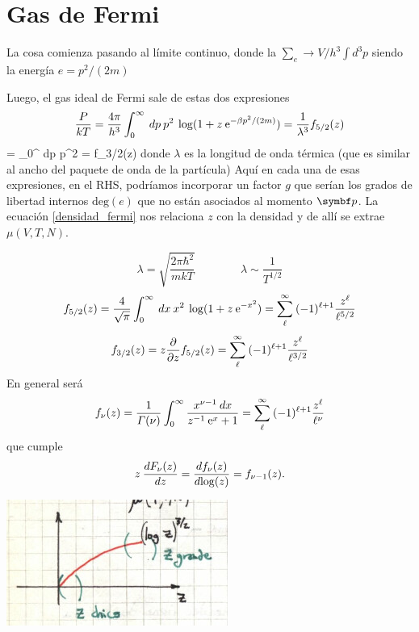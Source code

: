 \documentclass[10pt,oneside]{CBFT_book}
\begin{document}
\chapter{Gas de Fermi}

La cosa comienza pasando al límite continuo, donde la $\sum_e \to V/h^3 \int d^3p$ siendo la energía
$ e = p^2/(2m)$

Luego, el gas ideal de Fermi sale de estas dos expresiones
\[
	\frac{P}{kT} = \frac{4\pi}{h^3} \int_0^\infty \: dp \: p^2 \: 
	\log ( 1 + z \:\mathrm{e}^{-\beta p^2/(2m)} ) = 
	\frac{1}{\lambda^3} f_{5/2}(z)
\]
\be
	 =  \int_0^\infty \: dp \: p^2 \: 
	 = 
	 f_{3/2}(z)
	\label{densidad_fermi}
\ee
donde $\lambda$ es la longitud de onda térmica (que es similar al ancho del paquete de onda de la partícula)
Aquí en cada una de esas expresiones, en el RHS, podríamos incorporar un factor $g$ que serían los grados de 
libertad internos $\text{deg}(e)$ que no están asociados al momento $\vbp$.
La ecuación \eqref{densidad_fermi} nos relaciona $z$ con la densidad y de allí se extrae $\mu(V,T,N)$.


\[
	\lambda = \sqrt{ \frac{ 2 \pi \hbar^2 }{ m k T } } \qquad \qquad \lambda \sim \frac{ 1 }{ T^{1/2} }
\]
\[
	f_{5/2}(z) = \frac{4}{\sqrt{\pi}} \int_0^\infty \: dx \: x^2 \: 
	\log ( 1 + z \:\mathrm{e}^{-x^2} ) =
	\sum_\ell^\infty \: (-1)^{\ell+1} \frac{z^\ell}{\ell^{5/2}} 
\]
\[
	f_{3/2}(z) = z \frac{\partial^{\hspace{-0.05em}} {}}{\partial {z}^{\hspace{-0.05em}}} f_{5/2}(z) = 
	\sum_\ell^\infty \: (-1)^{\ell+1} \frac{z^\ell}{\ell^{3/2}} 
\]
En general será
\[
	f_\nu(z) = \frac{1}{\Gamma(\nu)} \int_0^\infty \frac{ x^{\nu-1} \: dx }{ z^{-1} \:\mathrm{e}^{x} + 1 } =
	\sum_\ell^\infty \: (-1)^{\ell+1} \frac{z^\ell}{\ell^{\nu}} 
\]
que cumple
\[
	z \: \frac{d^{\hspace{-0.05em}} {F_\nu(z)}}{d {z}^{\hspace{-0.05em}}} = \frac{d^{\hspace{-0.05em}} {f_\nu(z)}}{d {\log(z)}^{\hspace{-0.05em}}} = f_{\nu-1}(z).
\]


\includegraphics[scale=0.5]{images/1606329601.jpg}
\end{document}

